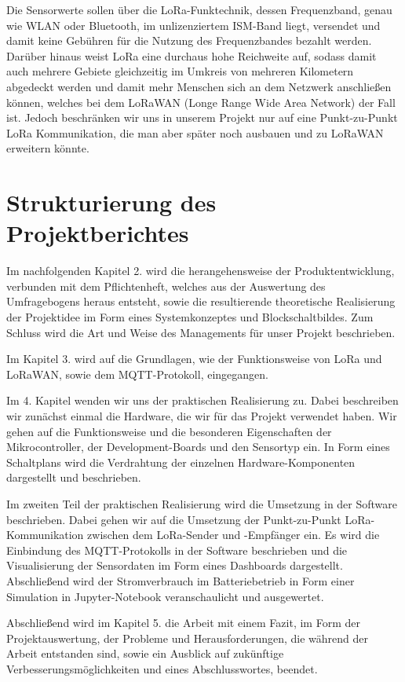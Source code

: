 Die Sensorwerte sollen über die LoRa-Funktechnik, dessen Frequenzband, genau wie WLAN oder Bluetooth, im unlizenziertem ISM-Band liegt, versendet und damit keine Gebühren für die Nutzung des Frequenzbandes bezahlt werden. Darüber hinaus weist LoRa eine durchaus hohe Reichweite auf, sodass damit auch mehrere Gebiete gleichzeitig im Umkreis von mehreren Kilometern abgedeckt werden und damit mehr Menschen sich an dem Netzwerk anschließen können, welches bei dem LoRaWAN (Longe Range Wide Area Network) der Fall ist. Jedoch beschränken wir uns in unserem Projekt nur auf eine Punkt-zu-Punkt LoRa Kommunikation, die man aber später noch ausbauen und zu LoRaWAN erweitern könnte.  

\section{Strukturierung des Projektberichtes} \label{Strukturierung des Projektberichtes}

Im nachfolgenden Kapitel 2. wird die herangehensweise der Produktentwicklung, verbunden mit dem Pflichtenheft, welches aus der Auswertung des Umfragebogens heraus entsteht, sowie die resultierende theoretische Realisierung der Projektidee im Form eines Systemkonzeptes und Blockschaltbildes. Zum Schluss wird die Art und Weise des Managements für unser Projekt beschrieben. 

Im Kapitel 3. wird auf die Grundlagen, wie der Funktionsweise von LoRa und LoRaWAN, sowie dem MQTT-Protokoll, eingegangen.  

Im 4. Kapitel wenden wir uns der praktischen Realisierung zu. Dabei beschreiben wir zunächst einmal die Hardware, die wir für das Projekt verwendet haben. Wir gehen auf die Funktionsweise und die besonderen Eigenschaften der Mikrocontroller, der Development-Boards und den Sensortyp ein. In Form eines Schaltplans wird die Verdrahtung der einzelnen Hardware-Komponenten dargestellt und beschrieben.

Im zweiten Teil der praktischen Realisierung wird die Umsetzung in der Software beschrieben. Dabei gehen wir auf die Umsetzung der Punkt-zu-Punkt LoRa-Kommunikation zwischen dem LoRa-Sender und -Empfänger ein. Es wird die Einbindung des MQTT-Protokolls in der Software beschrieben und die Visualisierung der Sensordaten im Form eines Dashboards dargestellt. Abschließend wird der Stromverbrauch im Batteriebetrieb in Form einer Simulation in Jupyter-Notebook veranschaulicht und ausgewertet. 

Abschließend wird im Kapitel 5. die Arbeit mit einem Fazit, im Form der Projektauswertung, der Probleme und Herausforderungen, die während der Arbeit entstanden sind, sowie ein Ausblick auf zukünftige Verbesserungsmöglichkeiten und eines Abschlusswortes, beendet. 

